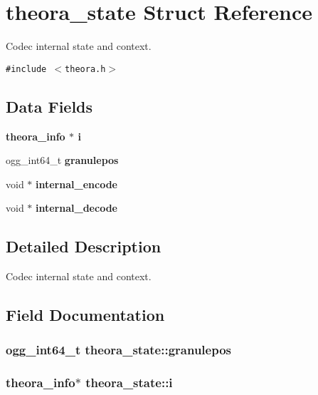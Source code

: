 \section{theora\_\-state Struct Reference}
\label{structtheora__state}
Codec internal state and context.  


{\tt \#include $<$theora.h$>$}

\subsection*{Data Fields}
\begin{CompactItemize}
\item 
\bf{theora\_\-info} $\ast$ \bf{i}
\item 
ogg\_\-int64\_\-t \bf{granulepos}
\item 
void $\ast$ \bf{internal\_\-encode}
\item 
void $\ast$ \bf{internal\_\-decode}
\end{CompactItemize}


\subsection{Detailed Description}
Codec internal state and context. 



\subsection{Field Documentation}
\subsubsection{\setlength{\rightskip}{0pt plus 5cm}ogg\_\-int64\_\-t \bf{theora\_\-state::granulepos}}\label{structtheora__state_5dd344a3f79ea7501b18c756772fab7b}


\subsubsection{\setlength{\rightskip}{0pt plus 5cm}\bf{theora\_\-info}$\ast$ \bf{theora\_\-state::i}}\label{structtheora__state_0efc7ac581ef260b0ca17f518ace0731}


